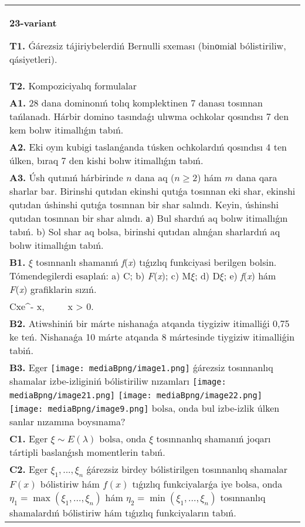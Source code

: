\documentclass{article}
\begin{document}
\begin{tabular}{m{17cm}}
\textbf{23-variant}
\newline

\textbf{T1.} Ǵárezsiz tájiriybelerdiń Bernulli sxeması (binоmiаl bólistiriliw, qásiyetleri).
 \\
\textbf{T2.} Kompoziciyalıq formulalar \\
\textbf{A1.} 28 dana dominonıń tolıq komplektinen 7 danası tosınnan tańlanadı. Hárbir domino tasındaǵı ulıwma ochkolar qosındısı 7 den kem bolıw itimallıǵın tabıń.
 \\
\textbf{A2.} Eki oyın kubigi taslanǵanda túsken ochkolardıń qosındısı 4 ten úlken, bıraq 7 den kishi bolıw itimallıǵın tabıń.
 \\
\textbf{A3.} Úsh qutınıń hárbirinde $n$ dana aq ($n\ge 2$) hám $m$ dana qara sharlar bar. Birinshi qutıdan ekinshi qutıǵa tosınnan eki shar, ekinshi qutıdan úshinshi qutıǵa tosınnan bir shar salındı. Keyin, úshinshi qutıdan tosınnan bir shar alındı. а) Bul shardıń aq bolıw itimallıǵın tabıń. b) Sol shar aq bolsa, birinshi qutıdan alınǵan sharlardıń aq bolıw itimallıǵın tabıń.
 \\
\textbf{B1.} $\xi$ tosınnanlı shamanıń \emph{f}(\emph{x}) tıǵızlıq funkciyasi berilgen bolsin. Tómendegilerdi esaplań: a) C; b) \emph{F}(\emph{x}); c) M$\xi$; d) D$\xi$; e) \emph{f}(\emph{x}) hám \emph{F}(\emph{x}) grafiklarin sızıń.\(f(x) = \left\{ \begin{matrix}
\ \ \ \ \ \ \ \ 0,\ \ \ \ \ \ x \leq 0, \\
Cxe^{- x},\ \ \ \ \ x > 0.\ \ 
\end{matrix} \right.\ \)
 \\
\textbf{B2.} Atiwshiniń bir márte nishanaǵa atqanda tiygiziw itimalliǵi 0,75 ke teń. Nishanaǵa 10 márte atqanda 8 mártesinde tiygiziw itimalliǵin tabiń.
 \\
\textbf{B3.} Eger \texttt{[image: mediaBpng/image1.png]} ǵárezsiz tosınnanlıq shamalar izbe-izliginiń bólistiriliw nızamları
\texttt{[image: mediaBpng/image21.png]} \texttt{[image: mediaBpng/image22.png]} \texttt{[image: mediaBpng/image9.png]}
bolsa, onda bul izbe-izlik úlken sanlar nızamına boysınama?
 \\
\textbf{C1.} Eger \(\xi\sim E(\lambda)\) bolsa, onda \(\xi\) tosınnanlıq shamanıń joqarı tártipli baslanǵısh momentlerin tabıń.
 \\
\textbf{C2.} Eger \(\xi_{1},...,\xi_{n}\) ǵárezsiz birdey bólistirilgen tosınnanlıq shamalar \(F(x)\) bólistiriw hám \(f(x)\) tıǵızlıq funkciyalarǵa iye bolsa, onda \(\eta_{1} = \max\left( \xi_{1},...,\xi_{n} \right)\) hám \(\eta_{2} = \min\left( \xi_{1},...,\xi_{n} \right)\) tosınnanlıq shamalardıń bólistiriw hám tıǵızlıq funkciyaların tabıń.

\end{tabular}
\end{document}
